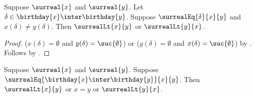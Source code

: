 \begin{lemma}\label{surreal_order_from_first_difference}
    Suppose $\surreal{x}$ and $\surreal{y}$.
    Let $\delta\in\birthday{x}\inter\birthday{y}$.
    Suppose $\surrealEq{\delta}{x}{y}$ and
        $x(\delta)\neq y(\delta)$.
    Then $\surrealLt{x}{y}$ or $\surrealLt{y}{x}$.
\end{lemma}
\begin{proof}
    ($x(\delta)=\emptyset$ and
        $y(\delta)=\suc{\emptyset}$) or
    ($y(\delta)=\emptyset$ and
        $x(\delta)=\suc{\emptyset}$)
        by .
    Follows by
        .
\end{proof}

\begin{lemma}\label{surreal_order_after_common_prefix}
    Suppose $\surreal{x}$ and $\surreal{y}$.
    Suppose
        $\surrealEq{\birthday{x}\inter\birthday{y}}{x}{y}$.
    Then $\surrealLt{x}{y}$ or $x=y$ or $\surrealLt{y}{x}$.
\end{lemma}
